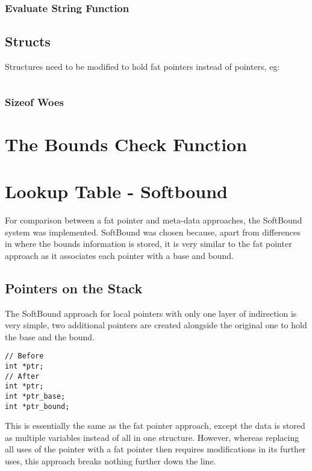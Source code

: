 \subsubsection{Evaluate String Function}

\subsection{Structs}

Structures need to be modified to hold fat pointers instead of pointers, eg:

\begin{verbatim}

\end{verbatim}
	
\subsubsection{Sizeof Woes}

\section{The Bounds Check Function}

\section{Lookup Table - Softbound}

For comparison between a fat pointer and meta-data approaches, the SoftBound system was implemented.
SoftBound was chosen because, apart from differences in where the bounds information is stored, it is very similar to the fat pointer approach as it associates each pointer with a base and bound.

\subsection{Pointers on the Stack}

The SoftBound approach for local pointers with only one layer of indirection is very simple, two additional pointers are created alongside the original one to hold the base and the bound.

\begin{verbatim}
// Before
int *ptr;
// After
int *ptr;
int *ptr_base;
int *ptr_bound;
\end{verbatim}

This is essentially the same as the fat pointer approach, except the data is stored as multiple variables instead of all in one structure.
However, whereas replacing all uses of the pointer with a fat pointer then requires modifications in its further uses, this approach breaks nothing further down the line.

